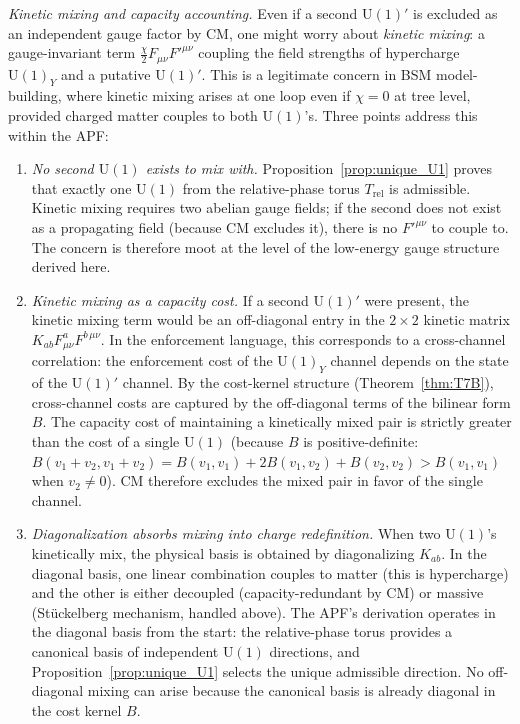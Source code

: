 \documentclass[11pt,a4paper]{article}
\theoremstyle{definition}
\newcommand{\U}{\mathrm{U}}
\begin{document}
\smallskip\noindent\textit{Kinetic mixing and capacity accounting.}\quad
Even if a second $\U(1)'$ is excluded as an independent gauge factor
by CM, one might worry about \emph{kinetic mixing}: a gauge-invariant
term $\frac{\chi}{2} F_{\mu\nu} F'^{\mu\nu}$ coupling the field
strengths of hypercharge $\U(1)_Y$ and a putative $\U(1)'$.  This is
a legitimate concern in BSM model-building, where kinetic mixing
arises at one loop even if $\chi = 0$ at tree level, provided charged
matter couples to both $\U(1)$'s.  Three points address this within
the APF:
\begin{enumerate}[label=(\alph*),nosep]
  \item \textit{No second $\U(1)$ exists to mix with.}\quad
  Proposition~\ref{prop:unique_U1} proves that exactly one $\U(1)$
  from the relative-phase torus $T_{\mathrm{rel}}$ is admissible.
  Kinetic mixing requires two abelian gauge fields; if the second
  does not exist as a propagating field (because CM excludes it),
  there is no $F'^{\mu\nu}$ to couple to.  The concern is therefore
  moot at the level of the low-energy gauge structure derived here.

  \item \textit{Kinetic mixing as a capacity cost.}\quad
  If a second $\U(1)'$ were present, the kinetic mixing term would
  be an off-diagonal entry in the $2 \times 2$ kinetic matrix
  $K_{ab} F^a_{\mu\nu} F^{b\,\mu\nu}$.  In the enforcement language,
  this corresponds to a cross-channel correlation: the enforcement
  cost of the $\U(1)_Y$ channel depends on the state of the
  $\U(1)'$ channel.  By the cost-kernel structure (Theorem~\ref{thm:T7B}),
  cross-channel costs are captured by the off-diagonal terms of the
  bilinear form $B$.  The capacity cost of maintaining a kinetically
  mixed pair is strictly greater than the cost of a single $\U(1)$
  (because $B$ is positive-definite: $B(v_1 + v_2, v_1 + v_2) =
  B(v_1, v_1) + 2B(v_1, v_2) + B(v_2, v_2) > B(v_1, v_1)$ when
  $v_2 \ne 0$).  CM therefore excludes the mixed pair in favor of the
  single channel.

  \item \textit{Diagonalization absorbs mixing into charge
  redefinition.}\quad
  When two $\U(1)$'s kinetically mix, the physical basis is obtained
  by diagonalizing $K_{ab}$.  In the diagonal basis, one linear
  combination couples to matter (this is hypercharge) and the other is
  either decoupled (capacity-redundant by CM) or massive
  (Stückelberg mechanism, handled above).  The APF's derivation
  operates in the diagonal basis from the start: the relative-phase
  torus provides a canonical basis of independent $\U(1)$ directions,
  and Proposition~\ref{prop:unique_U1} selects the unique admissible
  direction.  No off-diagonal mixing can arise because the canonical
  basis is already diagonal in the cost kernel $B$.
\end{enumerate}
\end{document}
